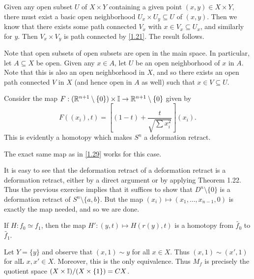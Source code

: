 \documentclass[../solutions.tex]{subfiles}
\begin{document}
\begin{exercise} \leavevmode
Given any open subset $U$ of $X\times Y$ containing a given point $(x,y)\in X\times Y$, there must exist a basic open neighborhood $U_x\times U_y\subseteq U$ of $(x,y)$. Then we know that there exists some path connected $V_x$ with $x\in V_x\subseteq U_x$, and similarly for $y$. Then $V_x\times V_y$ is path connected by \cref{1.21}. The result follows. 
\end{exercise} 

\begin{exercise} \leavevmode
Note that open subsets of open subsets are open in the main space. In particular, let $A\subseteq X$ be open. Given any $x\in A$, let $U$ be an open neighborhood of $x$ in $A$. Note that this is also an open neighborhood in $X$, and so there exists an open path connected $V$ in $X$ (and hence open in $A$ as well) such that $x\in V\subseteq U$. 
\end{exercise} 

\begin{exercise} \leavevmode
Consider the map $F:(\mathbb{R}^{n+1}\setminus\{0\})\times\mathbb I\to\mathbb{R}^{n+1}\setminus\{0\}$ given by \[F((x_i),t)=\left[(1-t)+\frac t{\sqrt{\sum x_i^2}}\right](x_i).\] This is evidently a homotopy which makes $S^n$ a deformation retract. 
\end{exercise} 

\begin{exercise} \leavevmode
The exact same map as in \cref{1.29} works for this case. 
\end{exercise} 

\begin{exercise} \leavevmode
It is easy to see that the deformation retract of a deformation retract is a deformation retract, either by a direct argument or by applying Theorem 1.22. Thus the previous exercise implies that it suffices to show that $D^n\setminus\{0\}$ is a deformation retract of $S^n\setminus\{a,b\}$. But the map $(x_i)\mapsto(x_1,\dots,x_{n-1},0)$ is exactly the map needed, and so we are done. 
\end{exercise} 

\begin{exercise} \leavevmode
If $H:f_0\simeq f_1$, then the map $H':(y,t)\mapsto H(r(y),t)$ is a homotopy from $\tilde{f_0}$ to $\tilde{f_1}$. 
\end{exercise} 

\begin{exercise} \leavevmode
Let $Y=\{y\}$ and observe that $(x,1)\sim y$ for all $x\in X$. Thus $(x,1)\sim(x',1)$ for alL $x,x'\in X$. Moreover, this is the only equivalence. Thus $M_f$ is precisely the quotient space $(X\times\mathbb I)/(X\times\{1\})=CX$.
\end{exercise} 
\end{document}
